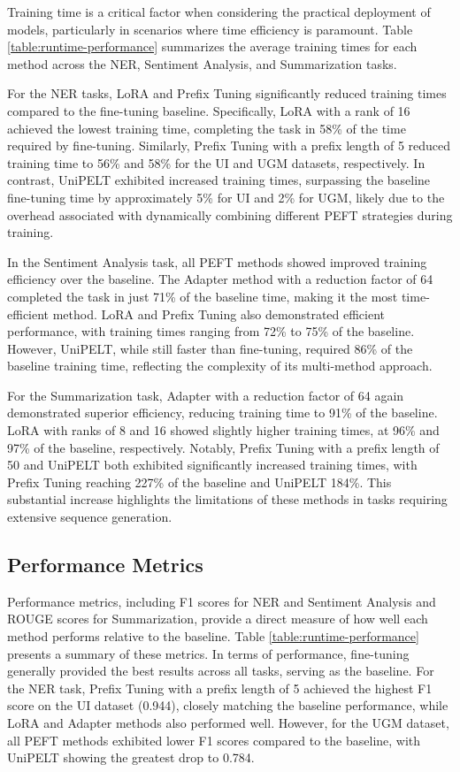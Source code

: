 Training time is a critical factor when considering the practical deployment of models, particularly in scenarios where time efficiency is paramount. Table \ref{table:runtime-performance} summarizes the average training times for each method across the NER, Sentiment Analysis, and Summarization tasks.

For the NER tasks, LoRA and Prefix Tuning significantly reduced training times compared to the fine-tuning baseline. Specifically, LoRA with a rank of 16 achieved the lowest training time, completing the task in 58\% of the time required by fine-tuning. Similarly, Prefix Tuning with a prefix length of 5 reduced training time to 56\% and 58\% for the UI and UGM datasets, respectively. In contrast, UniPELT exhibited increased training times, surpassing the baseline fine-tuning time by approximately 5\% for UI and 2\% for UGM, likely due to the overhead associated with dynamically combining different PEFT strategies during training.

In the Sentiment Analysis task, all PEFT methods showed improved training efficiency over the baseline. The Adapter method with a reduction factor of 64 completed the task in just 71\% of the baseline time, making it the most time-efficient method. LoRA and Prefix Tuning also demonstrated efficient performance, with training times ranging from 72\% to 75\% of the baseline. However, UniPELT, while still faster than fine-tuning, required 86\% of the baseline training time, reflecting the complexity of its multi-method approach.

For the Summarization task, Adapter with a reduction factor of 64 again demonstrated superior efficiency, reducing training time to 91\% of the baseline. LoRA with ranks of 8 and 16 showed slightly higher training times, at 96\% and 97\% of the baseline, respectively. Notably, Prefix Tuning with a prefix length of 50 and UniPELT both exhibited significantly increased training times, with Prefix Tuning reaching 227\% of the baseline and UniPELT 184\%. This substantial increase highlights the limitations of these methods in tasks requiring extensive sequence generation.

\subsection{Performance Metrics}

Performance metrics, including F1 scores for NER and Sentiment Analysis and ROUGE scores for Summarization, provide a direct measure of how well each method performs relative to the baseline. Table \ref{table:runtime-performance} presents a summary of these metrics. In terms of performance, fine-tuning generally provided the best results across all tasks, serving as the baseline. For the NER task, Prefix Tuning with a prefix length of 5 achieved the highest F1 score on the UI dataset (0.944), closely matching the baseline performance, while LoRA and Adapter methods also performed well. However, for the UGM dataset, all PEFT methods exhibited lower F1 scores compared to the baseline, with UniPELT showing the greatest drop to 0.784.

